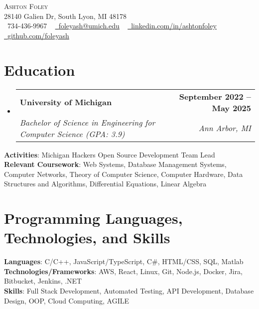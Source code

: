 \documentclass[letterpaper,11pt]{article}
\makeatletter
\newcommand{\resumeSubheading}[4]{
  \vspace{-2pt}\item
    \begin{tabular*}{1.0\textwidth}[t]{l@{\extracolsep{\fill}}r}
      \textbf{#1} & \textbf{\small #2} \\
      \textit{\small#3} & \textit{\small #4} \\
    \end{tabular*}\vspace{-7pt}
}
\newcommand{\resumeSubHeadingListStart}{\begin{itemize}[leftmargin=0.0in, label={}]}
\newcommand{\resumeSubHeadingListEnd}{\end{itemize}}
\makeatother
\begin{document}

\begin{center}
    {\Huge \scshape Ashton Foley} \\ \vspace{1pt}
    28140 Galien Dr, South Lyon, MI 48178 \\ \vspace{1pt}
    \small \raisebox{-0.1\height}\faPhone\ 734-436-9967 ~ \href{mailto:foleyash0@umich.edu}{\raisebox{-0.2\height}\faEnvelope\  \underline{foleyash@umich.edu}} ~ 
    \href{https://linkedin.com/in/ashtonfoley}{\raisebox{-0.2\height}\faLinkedin\ \underline{linkedin.com/in/ashtonfoley}}  ~
    \href{https://github.com/foleyash}{\raisebox{-0.2\height}\faGithub\ \underline{github.com/foleyash}}
    \vspace{-8pt}
\end{center}

\section{Education}
  \resumeSubHeadingListStart
    \resumeSubheading
      {University of Michigan}{September 2022 -- May 2025}
      {Bachelor of Science in Engineering for Computer Science (GPA: 3.9)}{Ann Arbor, MI}
  \resumeSubHeadingListEnd

\textbf{Activities}{: Michigan Hackers Open Source Development Team Lead} \\
\textbf{Relevant Coursework}{: Web Systems, Database Management Systems, Computer Networks, Theory of Computer Science, Computer Hardware, Data Structures and Algorithms, Differential Equations, Linear Algebra}

\section{Programming Languages, Technologies, and Skills}
 \begin{itemize}[leftmargin=0.15in, label={}]
    \small{\item{
     \textbf{Languages}{: C/C++, JavaScript/TypeScript, C\#, HTML/CSS, SQL, Matlab} \\
     \textbf{Technologies/Frameworks}{: AWS, React, Linux, Git, Node.js, Docker, Jira, Bitbucket, Jenkins, .NET} \\
     \textbf{Skills}{: Full Stack Development, Automated Testing, API Development, Database Design, OOP, Cloud Computing, AGILE} \\
    }}
 \end{itemize}
 \vspace{-16pt}
\end{document}
